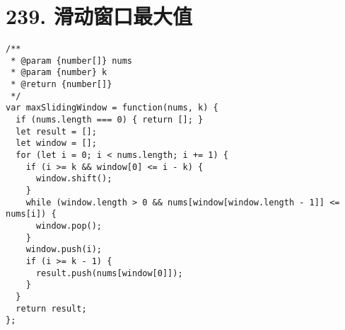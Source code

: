 \newpage
\section{239. 滑动窗口最大值}
\label{leetcode:239}

\begin{verbatim}
/**
 * @param {number[]} nums
 * @param {number} k
 * @return {number[]}
 */
var maxSlidingWindow = function(nums, k) {
  if (nums.length === 0) { return []; }
  let result = [];
  let window = [];
  for (let i = 0; i < nums.length; i += 1) {
    if (i >= k && window[0] <= i - k) {
      window.shift();
    }
    while (window.length > 0 && nums[window[window.length - 1]] <= nums[i]) {
      window.pop();
    }
    window.push(i);
    if (i >= k - 1) {
      result.push(nums[window[0]]);
    }
  }
  return result;
};
\end{verbatim}
